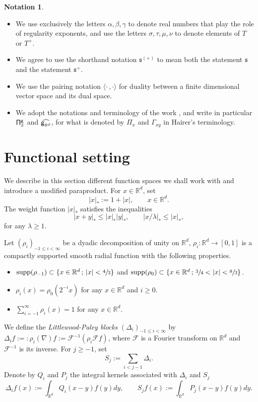 \documentclass[10pt]{amsart}
\DeclareMathOperator{\supp}{supp}
\theoremstyle{plain}
\theoremstyle{definition}
\newtheorem*{notation*} {Notation}
\newcommand{\frks}{\mathfrak{s}}
\newcommand{\bbR}{\mathbb{R}}
\newcommand{\mcF}{\mathcal{F}}
\begin{document}
\skpt
\begin{notation*}
\begin{itemize}
\item
We use exclusively the letters $\alpha, \beta, \gamma$ to denote real numbers that play the role of regularity exponents, and use the letters $\sigma, \tau, \mu, \nu$ to denote elements of $T$ or $T^+$.

\item
We agree to use the shorthand notation $\frks^{(+)}$ to mean both the statement $\frks$ and the statement $\frks^+$.

\item
We use the pairing notation $\langle \cdot\,,\cdot\rangle$ for duality between a finite dimensional vector space and its dual space.

\item
We adopt the notations and terminology of the work \cite{BH}, and write in particular ${\sf \Pi}^{\sf g}_x$ and $\widehat{{\sf g}_{yx}}$, for what is denoted by $\Pi_x$ and $\Gamma_{xy}$ in Hairer's terminology.
\end{itemize}
\end{notation*}

\section{Functional setting}
\label{SectionFunctionalSetting}

We describe in this section different function spaces we shall work with and introduce a modified paraproduct. For $x\in\bbR^d$, set\vspace*{-3pt}
\[
|x|_* := 1+|x|,\qquad x\in\bbR^d.
\]
The weight function $|x|_*$ satisfies the inequalities
\[
|x+y|_*\le|x|_*|y|_*, \qquad |x/\lambda|_*\le|x|_*,
\]
for any $\lambda\ge1$.

Let $(\rho_i)_{-1\leq i<\infty}$ be a dyadic decomposition of unity on $\bbR^d$, \ie $\rho_i:\bbR^d\to[0,1]$ is a compactly supported smooth radial function with the following properties.
\begin{itemize}
\item $\supp (\rho_{-1})\subset\{x\in\bbR^d\,;\,|x|<\sfrac43\}$ and $\supp (\rho_0)\subset\{x\in\bbR^d\,;\,\sfrac34<|x|<\sfrac83\}$.
\item $\rho_i(x)=\rho_0(2^{-i}x)$ for any $x\in\bbR^d$ and $i\ge0$.
\item $\sum_{i=-1}^\infty\rho_i(x)=1$ for any $x\in\bbR^d$.
\end{itemize}
We define the \emph{Littlewood-Paley blocks} $(\Delta_i)_{-1\leq i<\infty}$ by $\Delta_if :=: \rho_i(\nabla)f:= \mcF^{-1}(\rho_i\mcF f)$, where $\mcF$ is a Fourier transform on $\bbR^d$ and $\mcF^{-1}$ is its inverse. For $j\geq -1$, set
\[
S_j := \sum_{i<j-1}\Delta_i.
\]
Denote by $Q_i$ and $P_j$ the integral kernels associated with $\Delta_i$ and $S_j$
\[
\Delta_if(x) := \int_{\bbR^d} Q_i(x-y)f(y)dy, \qquad S_jf(x) := \int_{\bbR^d} P_j(x-y)f(y)dy.
\]
\end{document}
